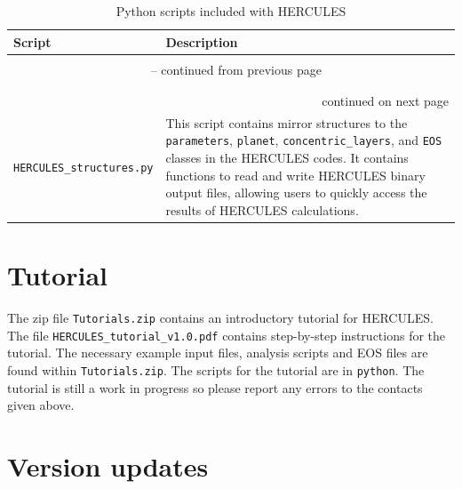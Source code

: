 \documentclass[11pt, oneside]{article}   	%
\begin{document}
\begin{longtable}{l p{10cm}}
\caption{Python scripts included with HERCULES}
\label{HUG:tab:EOS_files} \\

Script & Description \\ \hline \hline
\multicolumn{2}{l}{} \\
\endfirsthead

\multicolumn{2}{c}{{\tablename\ \thetable{} -- continued from previous page}} \\
\multicolumn{2}{l}{} \\
\endhead

\multicolumn{2}{l}{} \\
\multicolumn{2}{r}{{continued on next page}} \\
\endfoot

\endlastfoot

\texttt{HERCULES\_structures.py} & This script contains mirror structures to the \texttt{parameters}, \texttt{planet}, \texttt{concentric\_layers}, and \texttt{EOS} classes in the HERCULES codes. It contains functions to read and write HERCULES binary output files, allowing users to quickly access the results of HERCULES calculations.
\end{longtable}




\section{Tutorial}
\label{HUG:sec:tutorial}

The zip file \texttt{Tutorials.zip} contains an introductory tutorial for HERCULES. The file \texttt{HERCULES\_tutorial\_v1.0.pdf} contains step-by-step instructions for the tutorial. The necessary example input files, analysis scripts and EOS files are found within \texttt{Tutorials.zip}.  The scripts for the tutorial are in \texttt{python}. The tutorial is still a work in progress so please report any errors to the contacts given above.

\section{Version updates}
\label{HUG:sec:versions}
\end{document}
